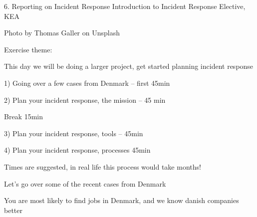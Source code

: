\documentclass[Screen16to9,17pt]{foils}
\begin{document}
\mytitlepage
{6. Reporting on Incident Response}
{Introduction to Incident Response Elective, KEA}




\begin{list2}
\item
\item
\item
\end{list2}

{\hfill \small Photo by Thomas Galler on Unsplash}


\begin{list2}
\item
\item
\item
\item
\item
\end{list2}

Exercise theme:
\begin{list2}
\item
\item
\item
\end{list2}


This day we will be doing a larger project, get started planning incident response
\begin{list2}
\item 1) Going over a few cases from Denmark -- first 45min
\item 2) Plan your incident response, the mission -- 45 min
\item Break 15min
\item 3) Plan your incident response, tools -- 45min
\item 4) Plan your incident response, processes 45min
\end{list2}

Times are suggested, in real life this process would take months!



Let's go over some of the recent cases from Denmark

You are most likely to find jobs in Denmark, and we know danish companies better
\end{document}
